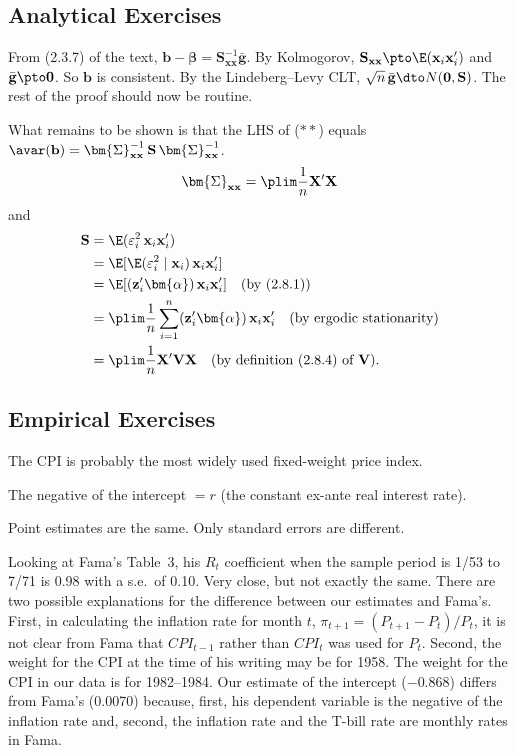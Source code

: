 \begin{answers}

\subsection*{Analytical Exercises}

From (2.3.7) of the text, $\mathbf{b} - \bm{\beta} = \mathbf{S}_{\mathbf{xx}}^{-1}\bar{\mathbf{g}}$.
By Kolmogorov, $\mathbf{S}_{\mathbf{xx}} \pto \E(\mathbf{x}_i\mathbf{x}_i')$ and
$\bar{\mathbf{g}} \pto \mathbf{0}$. So $\mathbf{b}$ is consistent. By the Lindeberg--Levy CLT,
$\sqrt{n}\,\bar{\mathbf{g}} \dto N(\mathbf{0}, \mathbf{S})$.
The rest of the proof should now be routine.

What remains to be shown is that the LHS of ($**$) equals
$\avar(\mathbf{b}) = \bm{\Sigma}_{\mathbf{xx}}^{-1}\,\mathbf{S}\,\bm{\Sigma}_{\mathbf{xx}}^{-1}$.
\[
\bm{\Sigma}_{\mathbf{xx}} = \plim \frac{1}{n}\mathbf{X}'\mathbf{X}
\]
and
\begin{align*}
\mathbf{S} &= \E(\varepsilon_i^2\,\mathbf{x}_i\mathbf{x}_i') \\
&= \E[\E(\varepsilon_i^2 \mid \mathbf{x}_i)\,\mathbf{x}_i\mathbf{x}_i'] \\
&= \E[(\mathbf{z}_i'\bm{\alpha})\,\mathbf{x}_i\mathbf{x}_i']
\quad \text{(by (2.8.1))} \\
&= \plim \frac{1}{n}\sum_{i=1}^{n}(\mathbf{z}_i'\bm{\alpha})\,\mathbf{x}_i\mathbf{x}_i'
\quad \text{(by ergodic stationarity)} \\
&= \plim \frac{1}{n}\mathbf{X}'\mathbf{V}\mathbf{X}
\quad \text{(by definition (2.8.4) of } \mathbf{V}\text{)}.
\end{align*}

\subsection*{Empirical Exercises}

The CPI is probably the most widely used fixed-weight price index.

The negative of the intercept $= r$ (the constant ex-ante real interest rate).

Point estimates are the same. Only standard errors are different.

Looking at Fama's Table~3, his $R_t$ coefficient when the sample period is 1/53 to
7/71 is 0.98 with a s.e.\ of 0.10. Very close, but not exactly the same. There are
two possible explanations for the difference between our estimates and Fama's.
First, in calculating the inflation rate for month $t$,
$\pi_{t+1} = (P_{t+1} - P_t)/P_t$, it is
not clear from Fama that $CPI_{t-1}$ rather than $CPI_t$ was used for $P_t$. Second, the
weight for the CPI at the time of his writing may be for 1958. The weight for
the CPI in our data is for 1982--1984. Our estimate of the intercept ($-0.868$)
differs from Fama's (0.0070) because, first, his dependent variable is the negative of the inflation rate and, second, the inflation rate and the T-bill rate are
monthly rates in Fama.


\end{answers}
